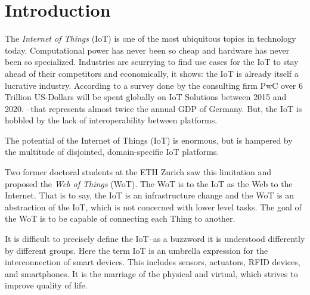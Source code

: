 \chapter{Introduction}





The \textit{Internet of Things} (IoT) is one of the most ubiquitous topics in technology today. Computational power has never been so cheap and hardware has never been so specialized.  Industries are scurrying to find use cases for the IoT to stay ahead of their competitors and economically, it shows: the IoT is already itself a lucrative industry. According to a survey done by the consulting firm PwC over 6 Trillion US-Dollars will be spent globally on IoT Solutions between 2015 and 2020.\cite{pwcIoT} --that represents almost twice the annual GDP of Germany.  But, the IoT is hobbled by the lack of interoperability between platforms.


The potential of the Internet of Things (IoT) is enormous, but is hampered by the multitude of disjointed, domain-specific IoT platforms.

Two former doctoral students at the ETH Zurich saw this limitation and proposed the \textit{Web of Things} (WoT). The WoT is to the IoT as the Web to the Internet. That is to say, the IoT is an infrastructure change and the WoT is an abstraction of the IoT, which is not concerned with lower level tasks. The goal of the WoT is to be capable of connecting each Thing to another.

It is difficult to precisely define the IoT--as a buzzword it is understood differently by different groups. Here the term IoT is an umbrella expression for the interconnection of smart devices. This includes sensors, actuators, RFID devices, and smartphones. \cite{Guinard2016} It is the marriage of the physical and virtual, which strives to improve quality of life.

